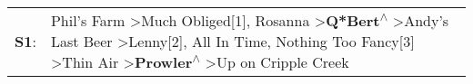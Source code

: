 \begin{supertabular}{p{0.03\textwidth}p{0.92\textwidth}}
 \textbf{S1}:  &  Phil's Farm\textsuperscript{} \textgreater \enspace Much Obliged[1]\textsuperscript{}, \enspace Rosanna\textsuperscript{} \textgreater \enspace \textbf{Q*Bert\textsuperscript{$\wedge$}} \textgreater \enspace Andy's Last Beer\textsuperscript{} \textgreater \enspace Lenny[2]\textsuperscript{}, \enspace All In Time\textsuperscript{}, \enspace Nothing Too Fancy[3]\textsuperscript{} \textgreater \enspace Thin Air\textsuperscript{} \textgreater \enspace \textbf{Prowler\textsuperscript{$\wedge$}} \textgreater \enspace Up on Cripple Creek\textsuperscript{}  \enspace  \\
\end{supertabular}
